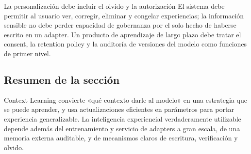
\begin{warningbox}{La personalización debe incluir el olvido y la autorización}
El sistema debe permitir al usuario ver, corregir, eliminar y congelar experiencias; la información sensible no debe perder capacidad de gobernanza por el solo hecho de haberse escrito en un adapter. Un producto de aprendizaje de largo plazo debe tratar el consent, la retention policy y la auditoría de versiones del modelo como funciones de primer nivel.
\end{warningbox}

\subsection{Resumen de la sección}

Context Learning convierte «qué contexto darle al modelo» en una estrategia que se puede aprender, y usa actualizaciones eficientes en parámetros para portar experiencia generalizable. La inteligencia experiencial verdaderamente utilizable depende además del entrenamiento y servicio de adapters a gran escala, de una memoria externa auditable, y de mecanismos claros de escritura, verificación y olvido.
